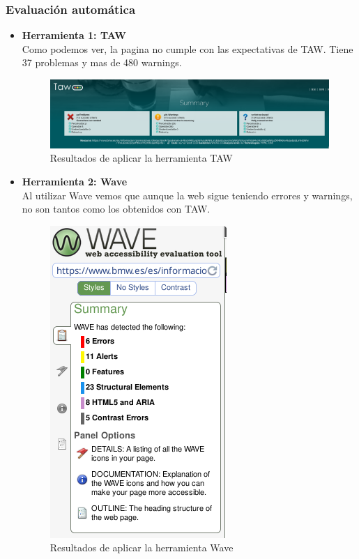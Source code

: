 \documentclass[a4paper,11pt]{article}
\begin{document}
\subsubsection{Evaluación automática}
\begin{itemize}
  \item \textbf{Herramienta 1: TAW}\\
  Como podemos ver, la pagina no cumple con las expectativas de TAW. Tiene 37 problemas y mas de 480 warnings.
  \begin{figure}[H]
    \centering
    \includegraphics[scale=0.35]{taw.png}
    \caption{Resultados de aplicar la herramienta TAW}
    \label{fig:nicss}
\end{figure}
  \item \textbf{Herramienta 2: Wave}\\
  Al utilizar Wave vemos que aunque la web sigue teniendo errores y warnings, no son tantos como los obtenidos con TAW.
  \begin{figure}[H]
    \centering
    \includegraphics[scale=0.6]{wave.png}
    \caption{Resultados de aplicar la herramienta Wave}
    \label{fig:nicss}
\end{figure}
\end{itemize}
\end{document}

